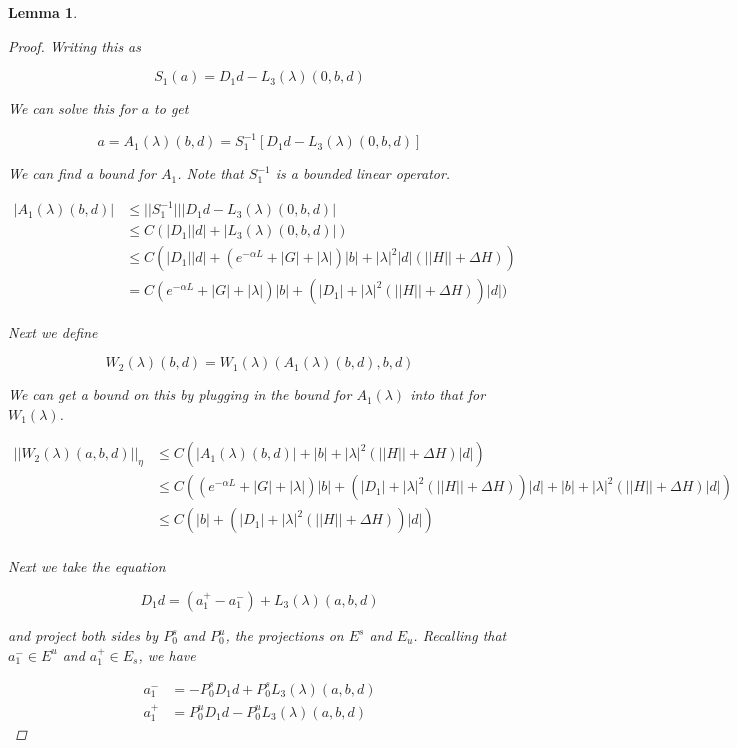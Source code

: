 \documentclass[12pt]{article}
\newtheorem{lemma}{Lemma}
\begin{document}
\begin{lemma}
\begin{proof}
Writing this as 

\[
S_1(a) = D_1 d - L_3(\lambda)(0, b, d) 
\]

We can solve this for $a$ to get

\begin{equation}
a = A_1(\lambda)(b,d) = S_1^{-1}[D_1 d - L_3(\lambda)(0, b, d)] 
\end{equation}

We can find a bound for $A_1$. Note that $S_1^{-1}$ is a bounded linear operator.

\begin{align*}
|A_1(\lambda)(b,d)| &\leq ||S_1^{-1}|||D_1 d - L_3(\lambda)(0, b, d)| \\
&\leq C (|D_1||d| + |L_3(\lambda)(0, b, d)|) \\
&\leq C (|D_1||d| + (e^{-\alpha L} + |G| + |\lambda|)|b| + |\lambda|^2|d|(||H|| + \Delta H ) )\\
&= C (e^{-\alpha L} + |G| + |\lambda|)|b| + (|D_1| + |\lambda|^2(||H|| + \Delta H ))|d| )
\end{align*}

Next we define

\begin{equation}\label{W2def}
W_2(\lambda)(b,d) = W_1(\lambda)(A_1(\lambda)(b,d),b,d)
\end{equation}

We can get a bound on this by plugging in the bound for $A_1(\lambda)$ into that for $W_1(\lambda)$.

\begin{align*}
||W_2(\lambda)(a,b,d)||_\eta &\leq C(|A_1(\lambda)(b,d)| + |b| + |\lambda|^2 ( ||H|| + \Delta H ) |d|) \\
&\leq C((e^{-\alpha L} + |G| + |\lambda|)|b| + (|D_1| + |\lambda|^2(||H|| + \Delta H ))|d| + |b| + |\lambda|^2 ( ||H|| + \Delta H ) |d|) \\
&\leq C(|b| + (|D_1| + |\lambda|^2(||H|| + \Delta H ))|d|) \\
\end{align*} 

Next we take the equation

\[
D_1 d = (a^+_1 - a^-_1) + L_3(\lambda)(a,b,d)
\]

and project both sides by $P_0^s$ and $P_0^u$, the projections on $E^s$ and $E_u$. Recalling that $a^-_1 \in E^u$ and $a^+_1 \in E_s$, we have

\begin{align*}
a^-_1 &= -P_0^s D_1 d + P_0^s L_3(\lambda)(a,b,d) \\
a^+_1 &= P_0^u D_1 d - P_0^u L_3(\lambda)(a,b,d)
\end{align*}


\end{proof}
\end{lemma}
\end{document}
